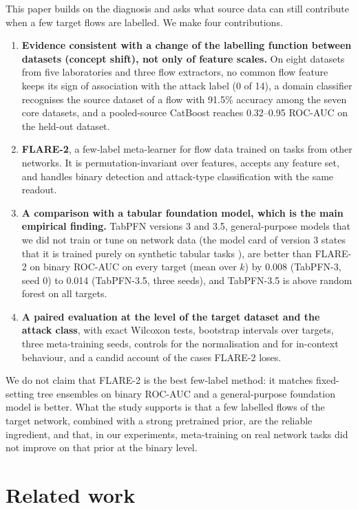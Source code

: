 \documentclass[11pt]{article}
\begin{document}
This paper builds on the diagnosis and asks what source data can still contribute when a few target flows are labelled.
We make four contributions.
\begin{enumerate}
\item \textbf{Evidence consistent with a change of the labelling function between datasets (concept shift), not only of feature scales.}
On eight datasets from five laboratories and three flow extractors, no common flow feature keeps its sign of association with the attack label (0 of 14), a domain classifier recognises the source dataset of a flow with 91.5\% accuracy among the seven core datasets, and a pooled-source CatBoost reaches 0.32--0.95 ROC-AUC on the held-out dataset.
\item \textbf{FLARE-2}, a few-label meta-learner for flow data trained on tasks from other networks.
It is permutation-invariant over features, accepts any feature set, and handles binary detection and attack-type classification with the same readout.
\item \textbf{A comparison with a tabular foundation model, which is the main empirical finding.}
TabPFN versions 3 and 3.5, general-purpose models that we did not train or tune on network data (the model card of version 3 states that it is trained purely on synthetic tabular tasks \citep{priorlabs2026tabpfn3}), are better than FLARE-2 on binary ROC-AUC on every target (mean over $k$) by 0.008 (TabPFN-3, seed 0) to 0.014 (TabPFN-3.5, three seeds), and TabPFN-3.5 is above random forest on all targets.
\item \textbf{A paired evaluation at the level of the target dataset and the attack class}, with exact Wilcoxon tests, bootstrap intervals over targets, three meta-training seeds, controls for the normalisation and for in-context behaviour, and a candid account of the cases FLARE-2 loses.
\end{enumerate}
We do not claim that FLARE-2 is the best few-label method: it matches fixed-setting tree ensembles on binary ROC-AUC and a general-purpose foundation model is better.
What the study supports is that a few labelled flows of the target network, combined with a strong pretrained prior, are the reliable ingredient, and that, in our experiments, meta-training on real network tasks did not improve on that prior at the binary level.

\section{Related work}
\end{document}
